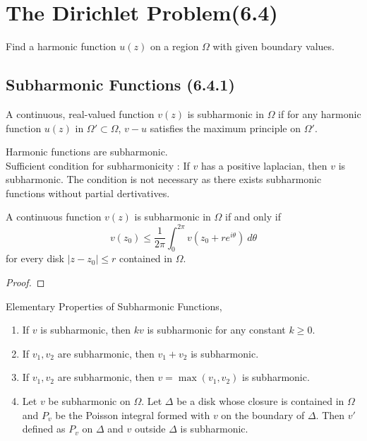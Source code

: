 \section{The Dirichlet Problem(6.4)}
\begin{definition}
	Find a harmonic function $u(z)$ on a region $\Omega$ with given boundary values.
\end{definition}

\subsection{Subharmonic Functions (6.4.1)}
\begin{definition}[subharmonic]
	A continuous, real-valued function $v(z)$ is subharmonic in $\Omega$ if for any harmonic function $u(z)$ in $\Omega' \subset \Omega$, $v-u$ satisfies the maximum principle on $\Omega'$.
\end{definition}

\begin{remark}
	Harmonic functions are subharmonic.\\
	
	Sufficient condition for subharmonicity : If $v$ has a positive laplacian, then $v$ is subharmonic. The condition is not necessary as there exists subharmonic functions without partial dertivatives.
\end{remark}

\begin{theorem}
	A continuous function $v(z)$ is subharmonic in $\Omega$ if and only if 
	\[ v(z_0) \le \frac{1}{2\pi} \int_0^{2\pi} v(z_0+re^{i\theta})\ d\theta \]
	for every disk $|z-z_0| \le r$ contained in $\Omega$.
\end{theorem}
\begin{proof}
\end{proof}

\begin{remark}
	Elementary Properties of Subharmonic Functions,
	\begin{enumerate}
		\item If $v$ is subharmonic, then $kv$ is subharmonic for any constant $k \ge 0$.
		\item If $v_1,v_2$ are subharmonic, then $v_1+v_2$ is subharmonic.
		\item If $v_1,v_2$ are subharmonic, then $v=\max(v_1,v_2)$ is subharmonic.
		\item Let $v$ be subharmonic on $\Omega$. Let $\Delta$ be a disk whose closure is contained in $\Omega$ and $P_v$ be the Poisson integral formed with $v$ on the boundary of $\Delta$. Then $v'$ defined as $P_v$ on $\Delta$ and $v$ outside $\Delta$ is subharmonic.
	\end{enumerate}
\end{remark}

